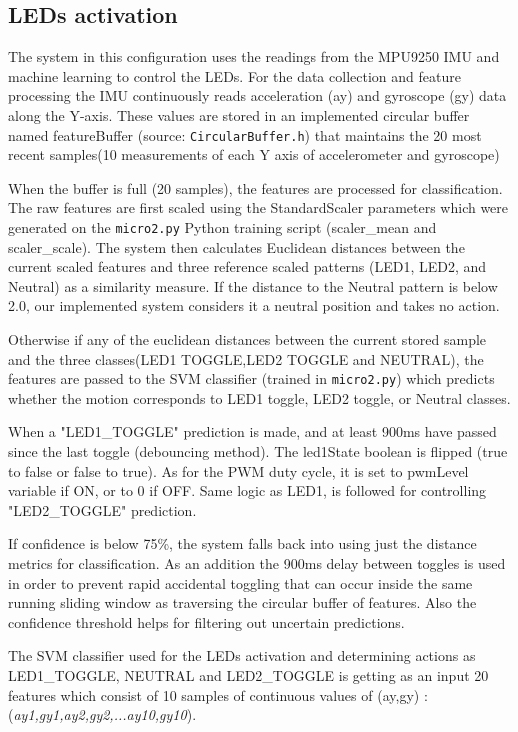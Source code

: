 \documentclass[a4paper,12pt]{article}
\begin{document}
\subsection{LEDs activation}
The system in this configuration uses the readings from the MPU9250 IMU 
and machine learning to control the LEDs. For the data collection and feature processing the IMU
continuously reads acceleration (ay) and gyroscope (gy) 
data along the Y-axis. These values are stored in an implemented circular buffer named featureBuffer (source: \texttt{CircularBuffer.h})
that maintains the 20 most recent samples(10 measurements of each Y axis of accelerometer and gyroscope)

When the buffer is full (20 samples), the features 
are processed for classification.
The raw features are first scaled using the StandardScaler parameters which were generated on the \texttt{micro2.py} Python training script
(scaler\_mean and scaler\_scale). 
The system then calculates Euclidean distances 
between the current scaled features and three reference scaled patterns 
(LED1, LED2, and Neutral) as a similarity measure.
If the distance to the Neutral pattern is below 2.0, our implemented system 
considers it a neutral position and takes no action.

Otherwise if any of the euclidean distances between the current stored sample and
the three classes(LED1 TOGGLE,LED2 TOGGLE and NEUTRAL), 
the features are passed to the SVM classifier (trained in \texttt{micro2.py}) 
which predicts whether the motion corresponds to LED1 toggle, 
LED2 toggle, or Neutral classes.

When a "LED1\_TOGGLE" prediction is made, 
and at least 900ms have passed since the last toggle (debouncing method).
The led1State boolean is flipped (true to false or false to true).
As for the PWM duty cycle, it is set to pwmLevel variable if ON, or to 0 if OFF.
Same logic as LED1, is followed for controlling "LED2\_TOGGLE" prediction.

If confidence is below 75\%, the system falls back 
into using just the distance metrics for classification.
As an addition the 900ms delay between toggles is used in order to prevent 
rapid accidental toggling that can occur inside the same running sliding window as
traversing the circular buffer of features.
Also the confidence threshold helps for filtering out uncertain predictions.

The SVM classifier used for the LEDs activation and determining actions as LED1\_TOGGLE, NEUTRAL and LED2\_TOGGLE
is getting as an input 20 features which consist of 10 samples of continuous values of (ay,gy) : 
\newline 
(\textit{ay1,gy1,ay2,gy2,...ay10,gy10}).
\end{document}
